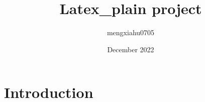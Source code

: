 \documentclass{article}
\title{Latex_plain project}
\author{mengxiahu0705 }
\date{December 2022}
\begin{document}
\maketitle

\section{Introduction}
\end{document}
